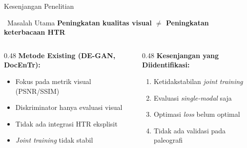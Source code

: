 \documentclass[aspectratio=169,10pt,t]{beamer}
\begin{document}
\begin{frame}{Kesenjangan Penelitian}
    \begin{block}{\faSearch~Masalah Utama}
        \centering
        \textbf{Peningkatan kualitas visual $\neq$ Peningkatan keterbacaan HTR}
    \end{block}
    
    \vspace{0.5em}
    \begin{columns}[T]
        \begin{column}{0.48\textwidth}
            \textbf{Metode Existing (DE-GAN, DocEnTr):}
            \begin{itemize}
                \item Fokus pada metrik visual (PSNR/SSIM)
                \item Diskriminator hanya evaluasi visual
                \item Tidak ada integrasi HTR eksplisit
                \item \textit{Joint training} tidak stabil
            \end{itemize}
        \end{column}
        \begin{column}{0.48\textwidth}
            \textbf{Kesenjangan yang Diidentifikasi:}
            \begin{enumerate}
                \item Ketidakstabilan \textit{joint training}
                \item Evaluasi \textit{single-modal} saja
                \item Optimasi \textit{loss} belum optimal
                \item Tidak ada validasi pada paleografi
            \end{enumerate}
        \end{column}
    \end{columns}
\end{frame}
\end{document}

